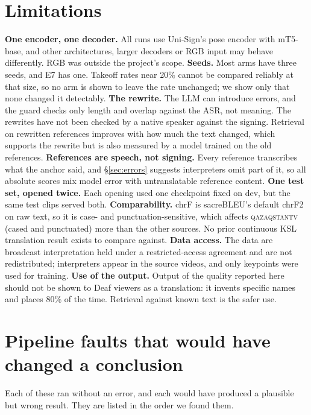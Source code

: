 \documentclass[11pt,twocolumn,a4paper]{article}
\newcommand{\src}[1]{\textsc{#1}}
\newcommand{\qz}{\src{qazaqstantv}}
\begin{document}
\section*{Limitations}

\textbf{One encoder, one decoder.} All runs use Uni-Sign's pose encoder with mT5-base, and other architectures, larger decoders or RGB input may behave differently. RGB was outside the project's scope. \textbf{Seeds.} Most arms have three seeds, and E7 has one. Takeoff rates near 20\% cannot be compared reliably at that size, so no arm is shown to leave the rate unchanged; we show only that none changed it detectably. \textbf{The rewrite.} The LLM can introduce errors, and the guard checks only length and overlap against the ASR, not meaning. The rewrites have not been checked by a native speaker against the signing. Retrieval on rewritten references improves with how much the text changed, which supports the rewrite but is also measured by a model trained on the old references. \textbf{References are speech, not signing.} Every reference transcribes what the anchor said, and \S\ref{sec:errors} suggests interpreters omit part of it, so all absolute scores mix model error with untranslatable reference content. \textbf{One test set, opened twice.} Each opening used one checkpoint fixed on dev, but the same test clips served both. \textbf{Comparability.} chrF is sacreBLEU's default chrF2 on raw text, so it is case- and punctuation-sensitive, which affects \qz{} (cased and punctuated) more than the other sources. No prior continuous KSL translation result exists to compare against. \textbf{Data access.} The data are broadcast interpretation held under a restricted-access agreement and are not redistributed; interpreters appear in the source videos, and only keypoints were used for training. \textbf{Use of the output.} Output of the quality reported here should not be shown to Deaf viewers as a translation: it invents specific names and places 80\% of the time. Retrieval against known text is the safer use.




\appendix
\onecolumn

\section{Pipeline faults that would have changed a conclusion}
\label{app:faults}

Each of these ran without an error, and each would have produced a plausible but wrong result. They are listed in the order we found them.
\end{document}
